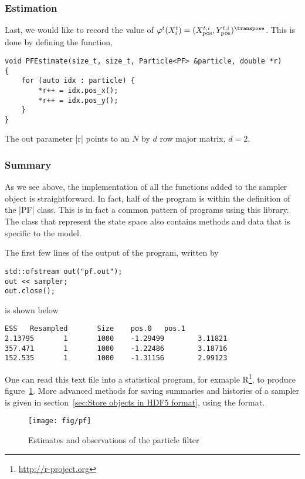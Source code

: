 \subsubsection{Estimation}

Last, we would like to record the value of $\varphi^t(X_i^t) =
(\xpos^{t,i},\ypos^{t,i})^{\transpose}$. This is done by defining the function,
\begin{verbatim}
void PFEstimate(size_t, size_t, Particle<PF> &particle, double *r)
{
    for (auto idx : particle) {
        *r++ = idx.pos_x();
        *r++ = idx.pos_y();
    }
}
\end{verbatim}
The out parameter |r| points to an $N$ by $d$ row major matrix, $d = 2$.

\subsubsection{Summary}

As we see above, the implementation of all the functions added to the sampler
object is straightforward. In fact, half of the program is within the
definition of the |PF| class. This is in fact a common pattern of programs
using this library. The class that represent the state space also contains
methods and data that is specific to the model.

The first few lines of the output of the program, written by
\begin{verbatim}
std::ofstream out("pf.out");
out << sampler;
out.close();
\end{verbatim}
is shown below
\begin{verbatim}
ESS   Resampled       Size    pos.0   pos.1
2.13795       1       1000    -1.29499        3.11821
357.471       1       1000    -1.22486        3.18716
152.535       1       1000    -1.31156        2.99123
\end{verbatim}
One can read this text file into a statistical program, for exmaple
R\footnote{\url{http://r-project.org}}, to produce figure~\ref{fig:pf}. More
advanced methods for saving summaries and histories of a sampler is given in
section~\ref{sec:Store objects in HDF5 format}, using the \hdf format.

\begin{figure}
  \texttt{[image: fig/pf]}
  \caption{Estimates and observations of the particle filter}
  \label{fig:pf}
\end{figure}
